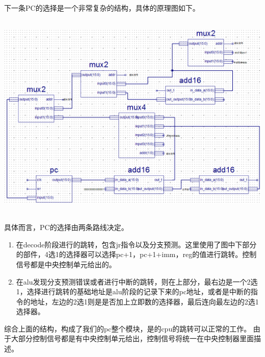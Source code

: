 下一条PC的选择是一个非常复杂的结构，具体的原理图如下。
\begin{center}
    \includegraphics[height=10cm]{image/detail/detail_pc_structure.png}
    \label{fig:pcstructure}
\end{center}
具体而言，PC的选择由两条路线决定。
\begin{enumerate}
    \item 在decode阶段进行的跳转，包含jr指令以及分支预测。这里使用了图中下部分的部件，4选1的选择器可以选择pc+1，pc+1+imm，reg的值进行跳转。控制信号都是中央控制单元给出的。
    \item 在alu发现分支预测错误或者进行中断的跳转，则在上部分，最右边是一个2选1，选择进行跳转的基础地址是alu阶段的记录下来的pc地址，或者是中断的指令的地址，左边的2选1则是是否加上立即数的选择器，最后连向最左边的2选1选择器。
\end{enumerate}
综合上面的结构，构成了我们的pc整个模块，是的cpu的跳转可以正常的工作。
由于大部分控制信号都是有中央控制单元给出，控制信号将统一在中央控制器里面描述。

